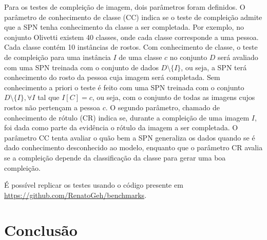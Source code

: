 \documentclass[12pt]{article}
\theoremstyle{plain}
\numberwithin{equation}{section}
\begin{document}
Para os testes de compleição de imagem, dois parâmetros foram definidos. O parâmetro de
conhecimento de classe (CC) indica se o teste de compleição admite que a SPN tenha conhecimento da
classe a ser completada. Por exemplo, no conjunto Olivetti existem 40 classes, onde cada classe
corresponde a uma pessoa. Cada classe contém 10 instâncias de rostos. Com conhecimento de classe, o
teste de compleição para uma instância $I$ de uma classe $c$ no conjunto $D$ será avaliado com uma
SPN treinada com o conjunto de dados $D\setminus\{I\}$, ou seja, a SPN terá conhecimento do rosto
da pessoa cuja imagem será completada. Sem conhecimento a priori o teste é feito com uma SPN
treinada com o conjunto $D\setminus\{I\}, \forall I$ tal que $I[C]=c$, ou seja, com o conjunto de
todas as imagens cujos rostos não pertençam a pessoa $c$. O segundo parâmetro, chamado de
conhecimento de rótulo (CR) indica se, durante a compleição de uma imagem $I$, foi dada como parte
da evidência o rótulo da imagem a ser completada. O parâmetro CC tenta avaliar o quão bem a SPN
generaliza os dados quando se é dado conhecimento desconhecido ao modelo, enquanto que o parâmetro
CR avalia se a compleição depende da classificação da classe para gerar uma boa compleição.

É possível replicar os testes usando o código presente em
\url{https://github.com/RenatoGeh/benchmarks}.

\section{Conclusão}

\printbibliography[]
\end{document}
